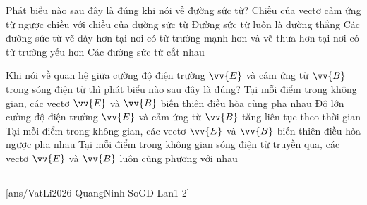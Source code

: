 	\begin{ex}%
		Phát biểu nào sau đây là đúng khi nói về đường sức từ?
		\choice
		{Chiều của vectơ cảm ứng từ ngược chiều với chiều của đường sức từ}
		{Đường sức từ luôn là đường thẳng}
		{\True Các đường sức từ vẽ dày hơn tại nơi có từ trường mạnh hơn và vẽ thưa hơn tại nơi có từ trường yếu hơn}
		{Các đường sức từ cắt nhau}
	\end{ex}

	\begin{ex}%
		Khi nói về quan hệ giữa cường độ điện trường $\vv{E}$ và cảm ứng từ $\vv{B}$ trong sóng điện từ thì phát biểu nào sau đây là đúng?
		\choice
		{\True Tại mỗi điểm trong không gian, các vectơ $\vv{E}$ và $\vv{B}$ biến thiên điều hòa cùng pha nhau}
		{Độ lớn cường độ điện trường $\vv{E}$ và cảm ứng từ $\vv{B}$ tăng liên tục theo thời gian}
		{Tại mỗi điểm trong không gian, các vectơ $\vv{E}$ và $\vv{B}$ biến thiên điều hòa ngược pha nhau}
		{Tại mỗi điểm trong không gian sóng điện từ truyền qua, các vectơ $\vv{E}$ và $\vv{B}$ luôn cùng phương với nhau}
	\end{ex}

	\subsection*{}
	\setcounter{ex}{0}
	[ans/VatLi2026-QuangNinh-SoGD-Lan1-2]

